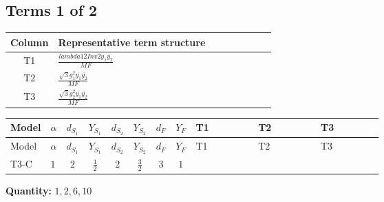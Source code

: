 \documentclass[8pt]{article}
\begin{document}
\begin{landscape}
\subsection*{Terms 1 of 2}
\begin{center}
\begin{tabular}{@{}c >{\raggedright\arraybackslash}p{0.82\linewidth}@{}}
\toprule
Column & Representative term structure \\
\midrule
T1 & \(\displaystyle \frac{lambda12Inv2 \overline{y_{1}} \overline{y_{2}}}{MF}\) \\
\midrule
T2 & \(\displaystyle \frac{\sqrt{3} g_{1}^{2} \overline{y_{1}} \overline{y_{2}}}{MF}\) \\
\midrule
T3 & \(\displaystyle \frac{\sqrt{3} g_{2}^{2} \overline{y_{1}} \overline{y_{2}}}{MF}\) \\
\midrule
\bottomrule
\end{tabular}
\end{center}
\smallskip
\tiny
\begin{longtable}{@{}llcccccc >{\raggedright\arraybackslash}p{0.21\linewidth} >{\raggedright\arraybackslash}p{0.21\linewidth} >{\raggedright\arraybackslash}p{0.21\linewidth}@{}}
\toprule
Model & $\alpha$ & $d_{S_1}$ & $Y_{S_1}$ & $d_{S_2}$ & $Y_{S_2}$ & $d_F$ & $Y_F$ & T1 & T2 & T3 \\
\midrule
\endfirsthead
\toprule
Model & $\alpha$ & $d_{S_1}$ & $Y_{S_1}$ & $d_{S_2}$ & $Y_{S_2}$ & $d_F$ & $Y_F$ & T1 & T2 & T3 \\
\midrule
\endhead
T3-C & $1$ & $2$ & $\frac{1}{2}$ & $2$ & $\frac{3}{2}$ & $3$ & $1$ & \scriptsize\adjustbox{max width=\linewidth}{$\begin{gathered} - \frac{lambda12Inv2 \overline{y_{1}} \overline{y_{2}}}{6 MF}\end{gathered}$} & \scriptsize\adjustbox{max width=\linewidth}{$\begin{gathered} - \frac{\sqrt{3} g_{1}^{2} \overline{y_{1}} \overline{y_{2}}}{4 MF}\end{gathered}$} & \scriptsize\adjustbox{max width=\linewidth}{$\begin{gathered} - \frac{\sqrt{3} g_{2}^{2} \overline{y_{1}} \overline{y_{2}}}{8 MF}\end{gathered}$} \\
\midrule
\bottomrule
\end{longtable}
\clearpage
\noindent\textbf{Quantity: }$\mathrm{1,2,6,10}$\par\smallskip

\end{landscape}
\end{document}
